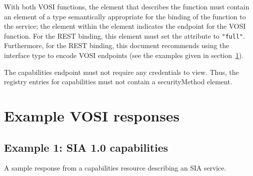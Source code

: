 \documentclass[11pt,letter]{ivoa}
\begin{document}
With both VOSI functions, the  element that
describes the function must contain an  element of a
type semantically appropriate for the binding of the function to the
service; the  element within the 
element indicates the endpoint for the VOSI function. For the REST
binding, this  element must set the 
attribute to \texttt{"full"}. Furthermore, for the REST binding, this
document recommends using the
 interface
type to encode VOSI endpoints (see the examples given in
section~\ref{sec:examples}). 

The capabilities endpoint must not require any
credentials to view.  Thus, the  registry entries for
capabilities must not contain a securityMethod element.

\section{Example VOSI responses}
\label{sec:examples}

\subsection{Example 1: SIA 1.0 capabilities}

A sample response from a capabilities resource describing an SIA service. 
\end{document}

